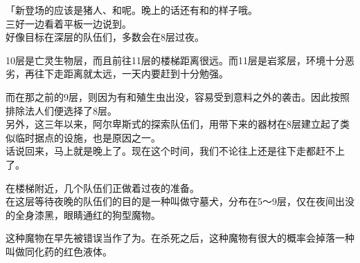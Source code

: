 「新登场的应该是猪人、和呢。晚上的话还有和的样子哦。\\

三好一边看着平板一边说到。\\

好像目标在深层的队伍们，多数会在8层过夜。

10层是亡灵生物层，而且前往11层的楼梯距离很远。而11层是岩浆层，环境十分恶劣，再往下走距离就太远，一天内要赶到十分勉强。

而在那之前的9层，则因为有和殖生虫出没，容易受到意料之外的袭击。因此按照排除法人们便选择了8层。\\

另外，这三年以来，阿尔卑斯式的探索队伍们，用带下来的器材在8层建立起了类似临时据点的设施，也是原因之一。\\

话说回来，马上就是晚上了。现在这个时间，我们不论往上还是往下走都赶不上了。

在楼梯附近，几个队伍们正做着过夜的准备。\\

在这层等待夜晚的队伍们的目的是一种叫做守墓犬，分布在5～9层，仅在夜间出没的全身漆黑，眼睛通红的狗型魔物。

这种魔物在早先被错误当作了为。在杀死之后，这种魔物有很大的概率会掉落一种叫做同化药的红色液体。

